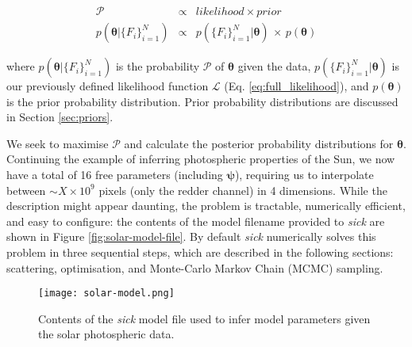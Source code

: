 \documentclass{aastex}
\newcommand{\sick}{\textit{sick}}
\begin{document}
\begin{eqnarray}
\mathcal{P} & \propto & likelihood \times prior \nonumber \\
p(\bm{\theta}|\{F_i\}_{i=1}^{N}) & \propto & p(\{F_i\}_{i=1}^{N}|\bm{\theta})\,\times\,p(\bm{\theta})
\label{eq:probability}
\end{eqnarray}

\noindent{}where $p(\bm{\theta}|\{F_i\}_{i=1}^{N})$ is the probability $\mathcal{P}$ of $\bm{\theta}$ given the data, $p(\{F_i\}_{i=1}^{N}|\bm{\theta})$ is our previously defined likelihood function $\mathcal{L}$ (Eq. \ref{eq:full_likelihood}), and $p(\bm{\theta})$ is the prior probability distribution. Prior probability distributions are discussed in Section \ref{sec:priors}.


We seek to maximise $\mathcal{P}$ and calculate the posterior probability distributions for $\bm{\theta}$. Continuing the example of inferring photospheric properties of the Sun, we now have a total of 16 free parameters (including $\bm{\psi}$), requiring us to interpolate between $\sim{}X\times10^{9}$ pixels (only the redder channel) in 4 dimensions. While the description might appear daunting, the problem is tractable, numerically efficient, and easy to configure: the contents of the model filename provided to \sick{} are shown in Figure \ref{fig:solar-model-file}. By default \sick{} numerically solves this problem in three sequential steps, which are described in the following sections: scattering, optimisation, and Monte-Carlo Markov Chain (MCMC) sampling.

\begin{figure}
\texttt{[image: solar-model.png]}
\caption{Contents of the \sick{} model file used to infer model parameters given the solar photospheric data.}
\end{figure}
\end{document}
